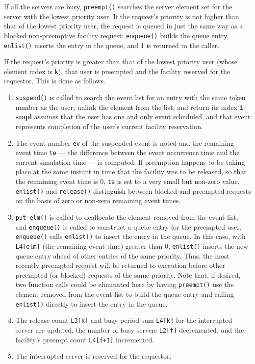 If all the servers are busy, \texttt{preempt()} searches the server element set
for the server with the lowest priority user. If the request's priority is not
higher than that of the lowest priority user, the request is queued in just the
same way as a blocked non-preemptive facility request: \texttt{enqueue()} builds
the queue entry, \texttt{enlist()} inserts the entry in the queue, and 1 is returned to
the caller.

If the request's priority is greater than that of the lowest priority user
(whose element index is \texttt{k}), that user is preempted and the facility reserved
for the requestor. This is done as follows.
\begin{enumerate}
\item \texttt{suspend()} is called to search the event list for an entry
with the same token number as the user, unlink the element
from the list, and return its index \texttt{i}. \textbf{smpl} assumes that the
user has one and only event scheduled, and that event represents
completion of the user's current facility reservation.
\item The event number \texttt{ev} of the suspended event is noted and
the remaining event time \texttt{te} --- the difference between the
event occurrence time and the current simulation time --- is
computed. If preemption happens to be taking place at the
same instant in time that the facility was to be released, so
that the remaining event time is 0, \texttt{te} is set to a very small
but non-zero value. \texttt{enlist()} and \texttt{release()} distinguish
between blocked and preempted requests on the basis of zero
or non-zero remaining event times.
\item \texttt{put\_elm()} is called to deallocate the element removed
from the event list, and \texttt{enqueue()} is called to construct a
queue entry for the preempted user. \texttt{enqueue()} calls
\texttt{enlist()} to insert the entry in the queue. In this case, with
\texttt{L4[elm]} (the remaining event time) greater than 0,
\texttt{enlist()} inserts the new queue entry ahead of other entries
of the same priority. Thus, the most recently preempted
request will be returned to execution before other preempted
(or blocked) requests of the same priority. Note that, if
desired, two function calls could be eliminated here by
having \texttt{preempt()} use the element removed from the event
list to build the queue entry and calling \texttt{enlist()} directly
to insert the entry in the queue.
\item The release count \texttt{L3[k]} and busy period sum \texttt{L4[k]} for
the interrupted server are updated, the number of busy
servers \texttt{L2[f]} decremented, and the facility's preempt count
\texttt{L4[f+1]} incremented.
\item The interrupted server is reserved for the requestor.
\end{enumerate}

